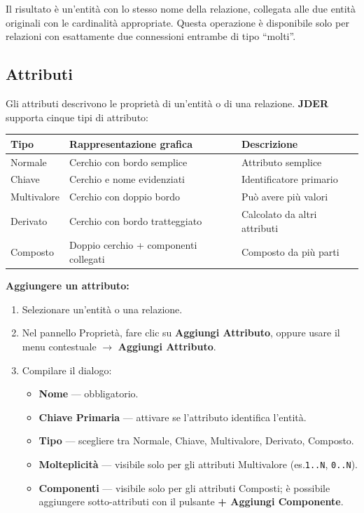 \documentclass[a4paper,11pt]{article}
\newcommand{\uielement}[1]{\textbf{#1}}
\newcommand{\jder}{\textbf{JDER}}
\begin{document}
Il risultato è un'entità con lo stesso nome della relazione, collegata alle due entità originali
con le cardinalità appropriate. Questa operazione è disponibile solo per relazioni con esattamente
due connessioni entrambe di tipo ``molti''.

\subsection{Attributi}

Gli attributi descrivono le proprietà di un'entità o di una relazione. \jder{} supporta cinque
tipi di attributo:

\begin{center}
\begin{tabular}{@{}lll@{}}
  \toprule
  \textbf{Tipo} & \textbf{Rappresentazione grafica} & \textbf{Descrizione} \\
  \midrule
  Normale    & Cerchio con bordo semplice & Attributo semplice \\
  Chiave     & Cerchio e nome evidenziati & Identificatore primario \\
  Multivalore & Cerchio con doppio bordo & Può avere più valori \\
  Derivato   & Cerchio con bordo tratteggiato & Calcolato da altri attributi \\
  Composto   & Doppio cerchio + componenti collegati & Composto da più parti \\
  \bottomrule
\end{tabular}
\end{center}

\textbf{Aggiungere un attributo:}
\begin{enumerate}
  \item Selezionare un'entità o una relazione.
  \item Nel pannello Proprietà, fare clic su \uielement{Aggiungi Attributo}, oppure usare il
        menu contestuale $\to$ \uielement{Aggiungi Attributo}.
  \item Compilare il dialogo:
        \begin{itemize}
          \item \textbf{Nome} --- obbligatorio.
          \item \textbf{Chiave Primaria} --- attivare se l'attributo identifica l'entità.
          \item \textbf{Tipo} --- scegliere tra Normale, Chiave, Multivalore, Derivato, Composto.
          \item \textbf{Molteplicità} --- visibile solo per gli attributi Multivalore
                (es.\@ \texttt{1..N}, \texttt{0..N}).
          \item \textbf{Componenti} --- visibile solo per gli attributi Composti; è possibile
                aggiungere sotto-attributi con il pulsante \uielement{+ Aggiungi Componente}.
        \end{itemize}
\end{enumerate}
\end{document}
